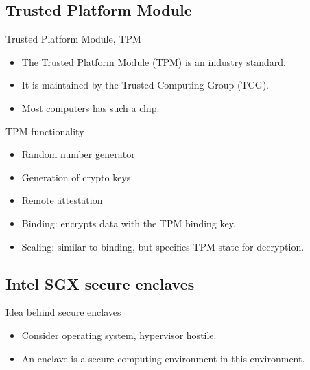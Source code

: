 \subsection{Trusted Platform Module}

\begin{frame}
  \begin{block}{Trusted Platform Module, TPM}
    \begin{itemize}
      \item The Trusted Platform Module (TPM) is an industry standard.
      \item It is maintained by the Trusted Computing Group (TCG).
      \item Most computers has such a chip.
    \end{itemize}
  \end{block}
\end{frame}

\begin{frame}
  \begin{block}{TPM functionality}
    \begin{itemize}
      \item Random number generator
      \item Generation of crypto keys
      \item Remote attestation
      \item Binding: encrypts data with the TPM binding key.
      \item Sealing: similar to binding, but specifies TPM state for 
        decryption.
    \end{itemize}
  \end{block}
\end{frame}

\subsection{Intel SGX secure enclaves}

\begin{frame}
  \begin{block}{Idea behind secure enclaves}
    \begin{itemize}
      \item Consider operating system, hypervisor hostile.
      \item An enclave is a secure computing environment in this environment.
    \end{itemize}
  \end{block}
\end{frame}


